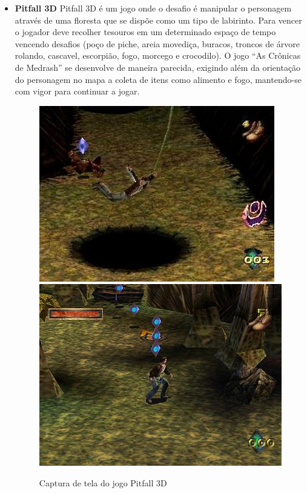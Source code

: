 \begin{itemize}
\item {\bf Pitfall 3D}
Pitfall 3D
 é um jogo onde o desafio é manipular o personagem através de uma floresta 
que se dispõe como um tipo de labirinto. Para vencer o jogador deve recolher 
tesouros em um determinado espaço de tempo vencendo desafios (poço de piche, 
areia movediça, buracos, troncos de árvore rolando, cascavel, escorpião, fogo, 
morcego e crocodilo).
O jogo ``As Crônicas de Medrash'' se desenvolve de maneira parecida, exigindo 
além da orientação do personagem no mapa a coleta de itens como alimento e fogo,
 mantendo-se com vigor para continuar a jogar.

\begin{figure}[!ht]
 \centering
 \includegraphics[scale=0.62]{Imagens/pit1.png}
 \includegraphics[scale=0.6]{Imagens/pit2.png}
 \caption{Captura de tela do jogo Pitfall 3D}
 \label{img:pitfall}
\end{figure}

\end{itemize}

